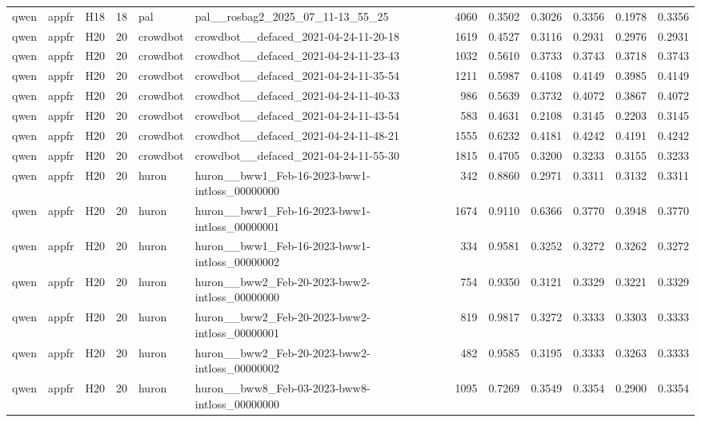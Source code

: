 \begin{table}[tbp]
\begin{tabular}{lllrllrrrrrr}
qwen & appfr & H18 & 18 & pal & pal\_\_rosbag2\_2025\_07\_11-13\_55\_25 & 4060 & 0.3502 & 0.3026 & 0.3356 & 0.1978 & 0.3356 \\
qwen & appfr & H20 & 20 & crowdbot & crowdbot\_\_defaced\_2021-04-24-11-20-18 & 1619 & 0.4527 & 0.3116 & 0.2931 & 0.2976 & 0.2931 \\
qwen & appfr & H20 & 20 & crowdbot & crowdbot\_\_defaced\_2021-04-24-11-23-43 & 1032 & 0.5610 & 0.3733 & 0.3743 & 0.3718 & 0.3743 \\
qwen & appfr & H20 & 20 & crowdbot & crowdbot\_\_defaced\_2021-04-24-11-35-54 & 1211 & 0.5987 & 0.4108 & 0.4149 & 0.3985 & 0.4149 \\
qwen & appfr & H20 & 20 & crowdbot & crowdbot\_\_defaced\_2021-04-24-11-40-33 & 986 & 0.5639 & 0.3732 & 0.4072 & 0.3867 & 0.4072 \\
qwen & appfr & H20 & 20 & crowdbot & crowdbot\_\_defaced\_2021-04-24-11-43-54 & 583 & 0.4631 & 0.2108 & 0.3145 & 0.2203 & 0.3145 \\
qwen & appfr & H20 & 20 & crowdbot & crowdbot\_\_defaced\_2021-04-24-11-48-21 & 1555 & 0.6232 & 0.4181 & 0.4242 & 0.4191 & 0.4242 \\
qwen & appfr & H20 & 20 & crowdbot & crowdbot\_\_defaced\_2021-04-24-11-55-30 & 1815 & 0.4705 & 0.3200 & 0.3233 & 0.3155 & 0.3233 \\
qwen & appfr & H20 & 20 & huron & huron\_\_bww1\_Feb-16-2023-bww1-intloss\_00000000 & 342 & 0.8860 & 0.2971 & 0.3311 & 0.3132 & 0.3311 \\
qwen & appfr & H20 & 20 & huron & huron\_\_bww1\_Feb-16-2023-bww1-intloss\_00000001 & 1674 & 0.9110 & 0.6366 & 0.3770 & 0.3948 & 0.3770 \\
qwen & appfr & H20 & 20 & huron & huron\_\_bww1\_Feb-16-2023-bww1-intloss\_00000002 & 334 & 0.9581 & 0.3252 & 0.3272 & 0.3262 & 0.3272 \\
qwen & appfr & H20 & 20 & huron & huron\_\_bww2\_Feb-20-2023-bww2-intloss\_00000000 & 754 & 0.9350 & 0.3121 & 0.3329 & 0.3221 & 0.3329 \\
qwen & appfr & H20 & 20 & huron & huron\_\_bww2\_Feb-20-2023-bww2-intloss\_00000001 & 819 & 0.9817 & 0.3272 & 0.3333 & 0.3303 & 0.3333 \\
qwen & appfr & H20 & 20 & huron & huron\_\_bww2\_Feb-20-2023-bww2-intloss\_00000002 & 482 & 0.9585 & 0.3195 & 0.3333 & 0.3263 & 0.3333 \\
qwen & appfr & H20 & 20 & huron & huron\_\_bww8\_Feb-03-2023-bww8-intloss\_00000000 & 1095 & 0.7269 & 0.3549 & 0.3354 & 0.2900 & 0.3354 \\

\end{tabular}
\end{table}
